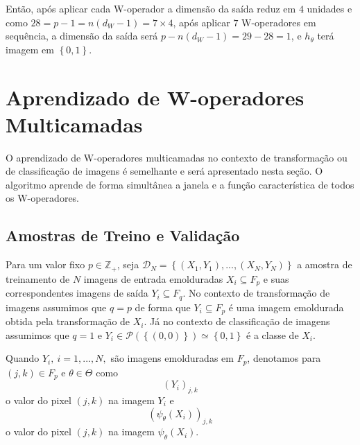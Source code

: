 Então, após aplicar cada W-operador a dimensão da saída reduz em $4$ unidades e como $28 = p-1 = n \left( d_{W}-1 \right) = 7 \times 4$, após aplicar $7$ W-operadores em sequência, a dimensão da saída será $p - n \left( d_{W}-1 \right) = 29 - 28 = 1$, e $h_{\theta}$ terá imagem em $\left\{ 0,1 \right\}$. 


\section{Aprendizado de W-operadores Multicamadas}
\label{sec:aprendizado}

O aprendizado de W-operadores multicamadas no contexto de transformação ou de classificação de imagens é semelhante e será apresentado nesta seção. O algoritmo aprende de forma simultânea a janela e a função característica de todos os W-operadores.

\subsection{Amostras de Treino e Validação}

Para um valor fixo $p \in \mathbb{Z}_{+} $, seja $\mathcal{D}_{N} = \left\{ \left( X_{1}, Y_{1} \right),...,\left( X_{N}, Y_{N} \right) \right\} $ a amostra de treinamento de $N$ imagens de entrada emolduradas $X_{i} \subseteq F_{p} $ e suas correspondentes imagens de saída $Y_{i} \subseteq F_{q} $. No contexto de transformação de imagens assumimos que $q = p$ de forma que $Y_{i} \subseteq F_{p} $ é uma imagem emoldurada obtida pela transformação de $X_{i}$. Já no contexto de classificação de imagens assumimos que $q=1$ e $Y_{i} \in \mathcal{P} \left( \left\{ \left( 0,0 \right) \right\} \right) \simeq \left\{ 0,1 \right\} $ é a classe de $X_{i}$.

Quando $ Y_{i}, \ i = 1,...,N,$ são imagens emolduradas em $F_{p}$, denotamos para $ \left( j,k \right) \in F_{p} $ e $\theta \in \Theta$ como
$$\left( Y_{i} \right)_{j,k}$$
o valor do pixel $\left( j,k \right)$ na imagem $Y_{i}$ e 
$$ \left( \psi_{\theta} \left( X_{i} \right) \right)_{j,k} $$
o valor do pixel $\left( j,k \right)$ na imagem $\psi_{\theta} \left( X_{i} \right)$.

